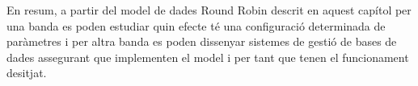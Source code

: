 {En resum, a partir del model de dades Round Robin descrit en aquest capítol per una banda es poden estudiar quin efecte té una configuració determinada de paràmetres i per altra banda es poden dissenyar sistemes de gestió de bases de dades assegurant que implementen el model i per tant que tenen el funcionament desitjat.
















}
